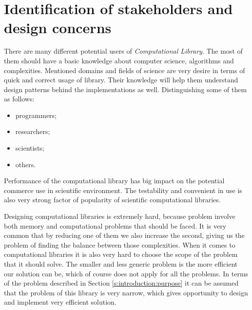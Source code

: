 \chapter{Identification of stakeholders and design concerns} \label{chp:identification-of-stakeholders-and-design-concerns}
	\begin{comment}
		An SDD shall identify the design stakeholders for the design subject.
		An SDD shall identify the design concerns of each identified design stakeholder.
		An SDD shall address each identified design concern.
		NOTE—An SDD can be used to satisfy the content guidelines for several types of design description as defined in
		ISO/IEC 15289:2006 [B25], by identifying their content guidelines as design concerns. The types of design
		descriptions are as follows: database design description (10.14),6 database detailed design description (10.15), highlevel
		software design description (10.22), interface description (10.27), low-level software design description (10.29),
		system description (10.71), and system element description (10.72).
	\end{comment}

	There are many different potential users of \emph{Computational Library}. The most of them should have a basic knowledge about computer science, algorithms and complexities. Mentioned domains and fields of science are very desire in terms of quick and correct usage of library. Their knowledge will help them understand design patterns behind the implementations as well. Distinguishing some of them as follows: 
	\begin{itemize}
		\item programmers;
		\item researchers;
		\item scientists;
		\item others.
	\end{itemize}
	Performance of the computational library has big impact on the potential commerce use in scientific environment. The testability and convenient in use is also very strong factor of popularity of scientific computational libraries. 
	
	Designing computational libraries is extremely hard, because problem involve both memory and computational problems that should be faced. It is very common that by reducing one of them we also increase the second, giving us the problem of finding the balance between those complexities. When it comes to computational libraries it is also very hard to choose the scope of the problem that it should solve. The smaller and less generic problem is the more efficient our solution can be, which of course does not apply for all the problems. In terms of the problem described in Section \ref{s:introduction:purpose} it can be assumed that the problem of this library is very narrow, which gives opportunity to design and implement very efficient solution.
